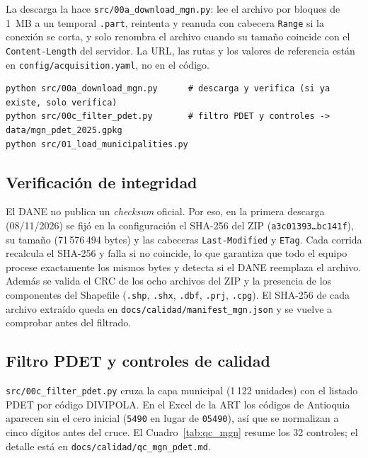 \documentclass[12pt, letterpaper]{article}
\begin{document}
La descarga la hace \texttt{src/00a\_download\_mgn.py}: lee el archivo por bloques de 1~MB a un temporal \texttt{.part}, reintenta y reanuda con cabecera \texttt{Range} si la conexión se corta, y solo renombra el archivo cuando su tamaño coincide con el \texttt{Content-Length} del servidor. La URL, las rutas y los valores de referencia están en \texttt{config/acquisition.yaml}, no en el código.

\begin{lstlisting}[style=lab]
python src/00a_download_mgn.py      # descarga y verifica (si ya existe, solo verifica)
python src/00c_filter_pdet.py       # filtro PDET y controles -> data/mgn_pdet_2025.gpkg
python src/01_load_municipalities.py
\end{lstlisting}

\subsection{Verificación de integridad}
El DANE no publica un \emph{checksum} oficial. Por eso, en la primera descarga (08/11/2026) se fijó en la configuración el SHA-256 del ZIP (\texttt{a3c01393\ldots bc141f}), su tamaño (71\,576\,494 bytes) y las cabeceras \texttt{Last-Modified} y \texttt{ETag}. Cada corrida recalcula el SHA-256 y falla si no coincide, lo que garantiza que todo el equipo procese exactamente los mismos bytes y detecta si el DANE reemplaza el archivo. Además se valida el CRC de los ocho archivos del ZIP y la presencia de los componentes del Shapefile (\texttt{.shp}, \texttt{.shx}, \texttt{.dbf}, \texttt{.prj}, \texttt{.cpg}). El SHA-256 de cada archivo extraído queda en \texttt{docs/calidad/manifest\_mgn.json} y se vuelve a comprobar antes del filtrado.

\subsection{Filtro PDET y controles de calidad}
\texttt{src/00c\_filter\_pdet.py} cruza la capa municipal (1\,122 unidades) con el listado PDET por código DIVIPOLA. En el Excel de la ART los códigos de Antioquia aparecen sin el cero inicial (\texttt{5490} en lugar de \texttt{05490}), así que se normalizan a cinco dígitos antes del cruce. El Cuadro~\ref{tab:qc_mgn} resume los 32 controles; el detalle está en \texttt{docs/calidad/qc\_mgn\_pdet.md}.
\end{document}

